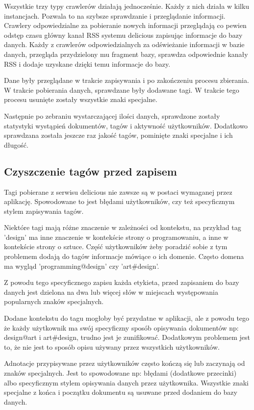 Wszystkie trzy typy crawlerów działają jednocześnie. Każdy z nich działa w kilku instancjach. Pozwala to na szybsze sprawdzanie i przeglądanie informacji. Crawlery odpowiedzialne za pobieranie nowych informacji przeglądają co pewien odstęp czasu główny kanał RSS systemu delicious zapisując informacje do bazy danych. Każdy z crawlerów odpowiedzialnych za odświeżanie informacji w bazie danych, przegląda przydzielony mu fragment bazy, sprawdza odpowiednie kanały RSS i dodaje uzyskane dzięki temu informacje do bazy.


Dane były przeglądane w trakcie zapisywania i po zakończeniu procesu zbierania. W trakcie pobierania danych, sprawdzane były dodawane tagi. W trakcie tego procesu usunięte zostały wszystkie znaki specjalne. 

Następnie po zebraniu wystarczającej ilości danych, sprawdzone zostały statystyki wystąpień dokumentów, tagów i aktywność użytkowników. Dodatkowo sprawdzana została jeszcze raz jakość tagów, pominięte znaki specjalne i ich długość.

\subsection{Czyszczenie tagów przed zapisem}

Tagi pobierane z serwisu delicious nie zawsze są w postaci wymaganej przez aplikację. Spowodowane to jest błędami użytkowników, czy też specyficznym stylem zapisywania tagów.

Niektóre tagi mają różne znaczenie w zależności od kontekstu, na przykład tag 'design' ma inne znaczenie w kontekście strony o programowaniu, a inne w kontekście strony o sztuce. Część użytkowników żeby poradzić sobie  z tym problemem dodają do tagów informacje mówiące o ich domenie. Często domena ma wygląd 'programming@design' czy 'art\#design'. 

Z powodu tego specyficznego zapisu każda etykieta, przed zapisaniem do bazy danych jest dzielona na dwa lub więcej słów w miejscach występowania popularnych znaków specjalnych. 

Dodane kontekstu do tagu mogłoby być przydatne w aplikacji, ale z powodu tego że każdy użytkownik ma swój specyficzny sposób opisywania dokumentów np: design@art i art\#design, trudno jest je zunifikować. Dodatkowym problemem jest to, że nie jest to sposób opisu używany przez wszystkich użytkowników. 


Adnotacje przypisywane przez użytkowników często kończą się lub zaczynają od znaków specjalnych. Jest to spowodowane np: błędami (dodatkowe przecinki) albo specyficznym stylem opisywania danych przez użytkownika. Wszystkie znaki specjalne z końca i początku dokumentu są usuwane przed dodaniem do bazy danych.

